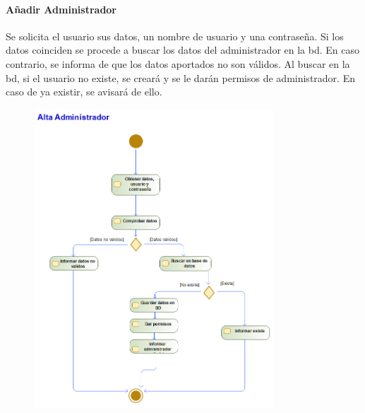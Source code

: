 \paragraph{Añadir Administrador}
Se solicita el usuario sus datos, un nombre de usuario y una contraseña. Si los datos coinciden se procede a buscar los datos del administrador en la \gls{bd}. En caso contrario, se informa de que los datos aportados no son válidos. Al buscar en la \gls{bd}, si el usuario no existe, se creará y se le darán permisos de administrador. En caso de ya existir, se avisará de ello.
\begin{figure}[H]
    \centering
    \includegraphics[width=0.8\textwidth]{Use_Cases/alta_admin.png}
\end{figure}
\newpage
